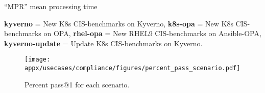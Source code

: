 \begin{table*}[h]
\begin{threeparttable}
\begin{tablenotes}
    \item ``MPR'' mean processing time\\
    \item \textbf{kyverno} = New K8s CIS-benchmarks on Kyverno, 
          \textbf{k8s-opa} = New K8s CIS-benchmarks on OPA, 
          \textbf{rhel-opa} = New RHEL9 CIS-benchmarks on Ansible-OPA,
          \textbf{kyverno-update} = Update K8s CIS-benchmarks on Kyverno.
  \end{tablenotes}
\end{threeparttable}
\end{table*}


\begin{figure*}
    \texttt{[image: appx/usecases/compliance/figures/percent\_pass\_scenario.pdf]}
    \caption{\label{fig:result:percent_repaired}Percent pass@1 for each scenario.}
    \label{fig:pass-percent-ciso}
\end{figure*}
